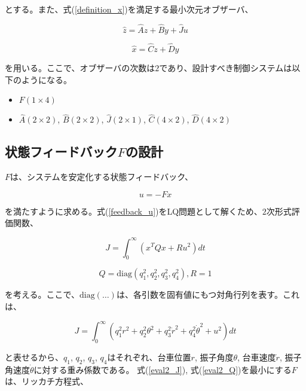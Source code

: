 とする。また、式(\ref{definition_x})を満足する最小次元オブザーバ、

\begin{equation}
    \hat{z} = \hat{A}z + \hat{B}y + \hat{J}u
    \label{z_hat}
\end{equation}

\begin{equation}
    \hat{x} = \hat{C}z + \hat{D}y
    \label{x_hat}
\end{equation}

を用いる。ここで、オブザーバの次数は$2$であり、設計すべき制御システムは以下のようになる。

\begin{itemize}
    \item $F(1 \times 4)$
    \item $\hat{A}(2 \times 2)$, $\hat{B}(2 \times 2)$, 
    $\hat{J}(2 \times 1)$, $\hat{C}(4 \times 2)$, $\hat{D}(4 \times 2)$
\end{itemize}


\subsection{状態フィードバック$F$の設計}
$F$は、システムを安定化する状態フィードバック、

\begin{equation}
    u = -Fx
    \label{feedback_u}
\end{equation}

を満たすように求める。式(\ref{feedback_u})をLQ問題として解くため、$2$次形式評価関数、

\begin{equation}
    J = \int_{0}^{\infty}
    \left(
        x^{T}Qx + Ru^2
    \right)
    dt
    \label{eval2_J}
\end{equation}

\begin{equation}
    Q = \mbox{diag}(q_{1}^2, q_{2}^2, q_{3}^2, q_{4}^2), R = 1
    \label{eval2_Q}
\end{equation}

を考える。ここで、$\mbox{diag}(\dots)$は、各引数を固有値にもつ対角行列を表す。これは、

\begin{equation}
    J = \int_{0}^{\infty}
    \left(
        q_{1}^2 r^2 + q_{2}^2 \theta^2 + q_{3}^2 \dot{r}^2 + q_{4}^2 \dot{\theta}^2 + u^2
    \right)
    dt
\end{equation}

と表せるから、$q_{1}$, $q_{2}$, $q_{3}$, $q_{4}$はそれぞれ、台車位置$r$, 振子角度$\theta$,
台車速度$\dot{r}$, 振子角速度$\dot{\theta}$に対する重み係数である。
式(\ref{eval2_J}), 式(\ref{eval2_Q})を最小にする$F$は、リッカチ方程式、

